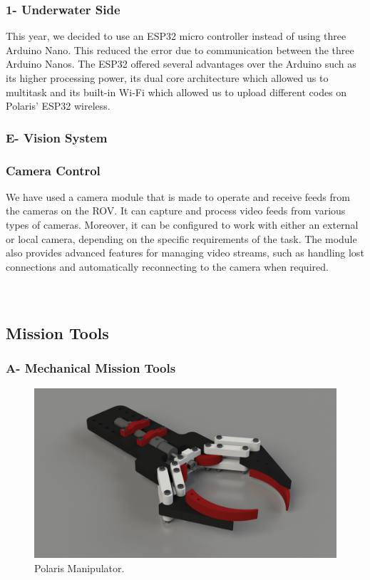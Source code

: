 \documentclass[a4paper,12pt,leqno]{report}
\begin{document}
\textcolor{orange!90}{
	\subsubsection{1- Underwater Side }}	
This year, we decided to use an ESP32 micro controller instead of using three Arduino Nano.  This reduced the error due to communication between the three Arduino Nanos. The ESP32  offered several advantages over the Arduino such as its higher processing power, its dual core architecture which allowed us to multitask and its built-in Wi-Fi which allowed us to upload  different codes on Polaris’ ESP32 wireless.\\
\textcolor{blue!40}{
	\subsubsection{E- Vision System}}
\textcolor{orange!90}{
\subsubsection{Camera Control}}	
We have used a camera module that is made to operate and receive feeds from the cameras on the ROV. It can capture and process video feeds from various types of cameras. Moreover, it can be configured to work with either an external or local camera, depending on the specific requirements of the task. The module also provides advanced features for managing video streams, such as handling lost connections and automatically  reconnecting to the camera when required. \\
\\ 
\\
\textcolor{blue!90}{
\subsection{Mission Tools}}
\textcolor{blue!40}{
\subsubsection{A- Mechanical Mission Tools}}
\begin{figure}
	\centering
	\includegraphics[width = .3\textwidth, height=.15\textheight]{micop7}
	\caption{Polaris Manipulator.}
\end{figure}
\end{document}
